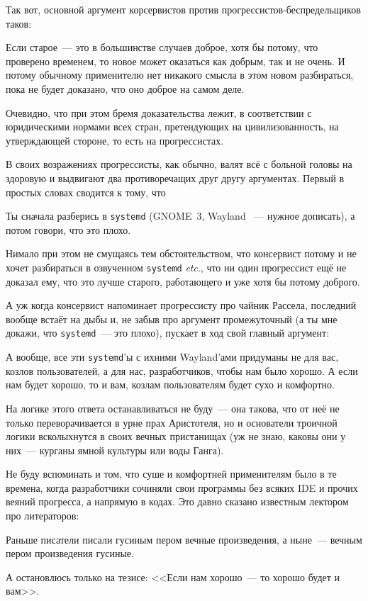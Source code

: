 Так вот, основной аргумент корсервистов против  прогрессистов-беспредельщиков таков:
\begin{shadequote}{}
Если старое~--- это в большинстве случаев доброе, хотя бы потому, что проверено временем, то новое может оказаться как добрым, так и не очень. И потому обычному применителю нет никакого смысла в этом новом разбираться, пока не будет доказано, что оно доброе на самом деле.
\end{shadequote}
Очевидно, что при этом  бремя доказательства лежит, в соответствии с юридическими нормами всех стран, претендующих на цивилизованность, на утверждающей стороне, то есть на прогрессистах.

В своих возражениях прогрессисты, как обычно, валят всё с больной головы на здоровую и выдвигают два противоречащих друг другу аргументах.  Первый в простых словах сводится к тому, что
\begin{shadequote}{}
Ты сначала разберись в \texttt{systemd} (GNOME~3, Wayland ~--- нужное дописать), а потом говори, что это плохо.
\end{shadequote}
Нимало при этом не смущаясь тем обстоятельством, что консервист потому и не хочет разбираться в озвученном \texttt{systemd} \textit{etc}., что ни один прогрессист ещё не доказал ему, что это лучше старого, работающего и уже хотя бы потому доброго.

А уж когда консервист напоминает прогрессисту про чайник Рассела, последний вообще встаёт на дыбы и, не забыв про аргумент промежуточный (а ты мне докажи, что \texttt{systemd}~--- это плохо), пускает в ход свой главный  аргумент:
\begin{shadequote}{}
А вообще, все эти \texttt{systemd}'ы с ихними Wayland'ами придуманы не для вас, козлов пользователей, а для нас, разработчиков, чтобы нам было хорошо. А если нам будет хорошо, то и вам, козлам пользователям будет сухо и комфортно.
\end{shadequote}
На логике этого ответа останавливаться не буду~--- она такова, что  от неё  не только переворачивается в урне прах Аристотеля, но и основатели троичной логики всколыхнутся в своих вечных пристанищах (уж не знаю, каковы они у них~--- курганы ямной культуры или воды Ганга).

Не буду вспоминать и том, что суше и комфортней применителям было в те времена, когда разработчики сочиняли свои программы без всяких IDE и прочих веяний прогресса, а напрямую в кодах. Это давно сказано известным лектором про литераторов:
\begin{shadequote}{}
Раньше писатели писали гусиным пером вечные произведения, а ныне~--- вечным пером произведения гусиные.
\end{shadequote}
А остановлюсь только на тезисе: <<Если нам хорошо~--- то хорошо будет и вам>>.

